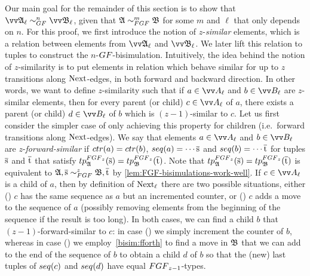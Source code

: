 Our main goal for the remainder of this section is to show that $\unravel{A}_{\ell} \bisimto_{\GF}^{n} \unravel{B}_{\ell}$, given that $\str{A} \bisimto_{\FGF}^{m} \str{B}$ for some $m$ and $\ell$ that only depends on $n$.
For this proof, we first introduce the notion of $z$-\emph{similar} elements, which is a relation between elements from $\unravel{A}_{\ell}$ and $\unravel{B}_{\ell}$.
We later lift this relation to tuples to construct the $n$-$\GF$-bisimulation.
Intuitively, the idea behind the notion of $z$-similarity is to put elements in relation which behave similar for up to $z$ transitions along $\mathrm{Next}$-edges, in both forward and backward direction.
In other words, we want to define $z$-similarity such that if $a \in \unraveldom{A}_{\ell}$ and $b \in \unraveldom{B}_{\ell}$ are $z$-similar elements, then for every parent (or child) $c \in \unraveldom{A}_{\ell}$ of $a$, there exists a parent (or child) $d \in \unraveldom{B}_{\ell}$ of $b$ which is $(z-1)$-similar to $c$.
Let us first consider the simpler case of only achieving this property for children (i.e.\ forward transitions along $\mathrm{Next}$-edges).
We say that elements $a \in \unraveldom{A}_{\ell}$ and $b \in \unraveldom{B}_{\ell}$ are $z$-\emph{forward-similar} if $\ctr{a} = \ctr{b}$, $\seq{a} = \cdots \elemtuples$ and $\seq{b} = \cdots \elemtuplet$ for tuples $\overline{\mathrm{s}}$ and $\overline{\mathrm{t}}$ that satisfy $\tp{\FGF_{z}}{\str{A}}{\elemtuples} = \tp{\FGF_{z}}{\str{B}}{\elemtuplet}$.
Note that $\tp{\FGF_{z}}{\str{A}}{\elemtuples} = \tp{\FGF_{z}}{\str{B}}{\elemtuplet}$ is equivalent to $\str{A}, \elemtuples \bisimto_{\FGF}^{z} \str{B}, \elemtuplet$ by \cref{lem:FGF-bisimulations-work-well}.
If $c \in \unraveldom{A}_{\ell}$ is a child of $a$, then by definition of $\mathrm{Next}_{\ell}$ there are two possible situations, either () $c$ has the same sequence as $a$ but an incremented counter, or () $c$ adds a move to the sequence of $a$ (possibly removing elements from the beginning of the sequence if the result is too long).
In both cases, we can find a child $b$ that $(z-1)$-forward-similar to $c$: in case () we simply increment the counter of $b$, whereas in case () we employ~\ref{bisim:fforth} to find a move in ${\mathfrak{B}}$ that we can add to the end of the sequence of $b$ to obtain a child $d$ of $b$ so that the (new) last tuples of $\seq{c}$ and $\seq{d}$ have equal $\FGF_{z-1}$-types.

